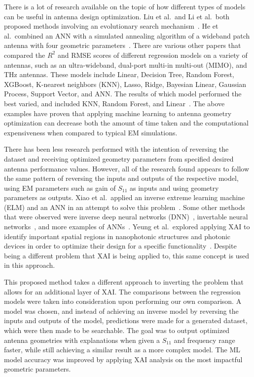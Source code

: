 \documentclass[conference]{IEEEtran}
\begin{document}
There is a lot of research available on the topic of how different types of models can be useful in antenna design optimization. Liu et al.~and Li et al.~both proposed methods involving an evolutionary search mechanism~\cite{liu_efficient_2014,li_adaptive_2023}. He et al.~combined an ANN with a simulated annealing algorithm of a wideband patch antenna with four geometric parameters~\cite{10318051}. There are various other papers that compared the $R^2$ and RMSE scores of different regression models on a variety of antennas, such as an ultra-wideband, dual-port multi-in multi-out (MIMO), and THz antennas. These models include Linear, Decision Tree, Random Forest, XGBoost, K-nearest neighbors (KNN), Lasso, Ridge, Bayesian Linear, Gaussian Process, Support Vector, and ANN. The results of which model performed the best varied, and included KNN, Random Forest, and Linear~\cite{9119820,ranjan_ultra-wideband_2022,ranjan_design_2023,sharma_machine_2020,jain_estimation_2022,jain_design_2024,haque_machine_2023,m_el-kenawy_optimized_2022}. The above examples have proven that applying machine learning to antenna geometry optimization can decrease both the amount of time taken and the computational expensiveness when compared to typical EM simulations.

There has been less research performed with the intention of reversing the dataset and receiving optimized geometry parameters from specified desired antenna performance values. However, all of the research found appears to follow the same pattern of reversing the inputs and outputs of the respective model, using EM parameters such as gain of $S_{11}$ as inputs and using geometry parameters as outputs. Xiao et al.~applied an inverse extreme learning machine (ELM) and an ANN in an attempt to solve this problem~\cite{9063448,XiaoLi-Ye2021IANN}. Some other methods that were observed were inverse deep neural networks (DNN)~\cite{wu_ai_2024,zhang_inverse_2023}, invertable neural networks~\cite{yu_design_2020}, and more examples of ANNs~\cite{yuan_multibranch_2020}. Yeung et al.~explored applying XAI to identify important spatial regions in nanophotonic structures and photonic devices in order to optimize their design for a specific functionality~\cite{YeungChristopher2020EtBo,YeungChristopher2022EAOP}. Despite being a different problem that XAI is being applied to, this same concept is used in this approach. 

This proposed method takes a different approach to inverting the problem that allows for an additional layer of XAI. The comparisons between the regression models were taken into consideration upon performing our own comparison. A model was chosen, and instead of achieving an inverse model by reversing the inputs and outputs of the model, predictions were made for a generated dataset, which were then made to be searchable. The goal was to output optimized antenna geometries with explanations when given a $S_{11}$ and frequency range faster, while still achieving a similar result as a more complex model. The ML model accuracy was improved by applying XAI analysis on the most impactful geometric parameters. 
\end{document}
